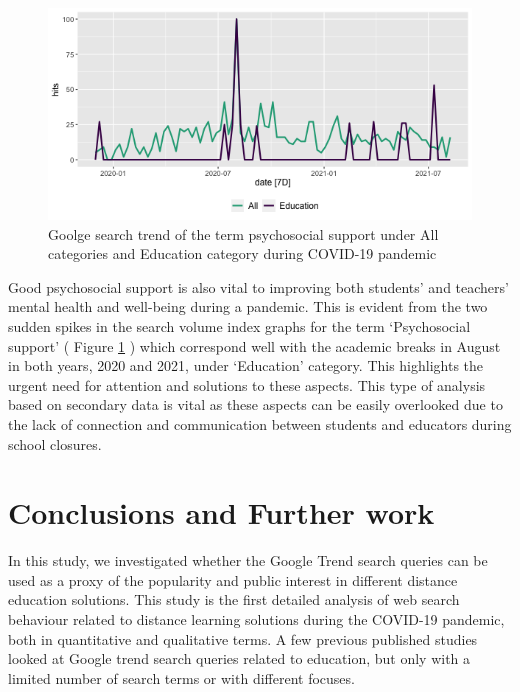 \documentclass[11pt,a4paper,]{article}
\begin{document}
\begin{figure}[h]

{\centering \includegraphics[width=1\textwidth]{figure/psychosocialSupport-1} 

}

\caption{Goolge search trend of the term psychosocial support under All categories and Education category during COVID-19 pandemic}\label{fig:psychosocialSupport}
\end{figure}

Good psychosocial support is also vital to improving both students' and teachers' mental health and well-being during a pandemic. This is evident from the two sudden spikes in the search volume index graphs for the term `Psychosocial support' ( Figure \ref{fig:psychosocialSupport} ) which correspond well with the academic breaks in August in both years, 2020 and 2021, under `Education' category. This highlights the urgent need for attention and solutions to these aspects. This type of analysis based on secondary data is vital as these aspects can be easily overlooked due to the lack of connection and communication between students and educators during school closures.

\hypertarget{conclusions-and-further-work}{%
\section{Conclusions and Further work}\label{conclusions-and-further-work}}

In this study, we investigated whether the Google Trend search queries can be used as a proxy of the popularity and public interest in different distance education solutions. This study is the first detailed analysis of web search behaviour related to distance learning solutions during the COVID-19 pandemic, both in quantitative and qualitative terms. A few previous published studies \autocite{vaughan2014web,kansal2021google} looked at Google trend search queries related to education, but only with a limited number of search terms or with different focuses.
\end{document}
